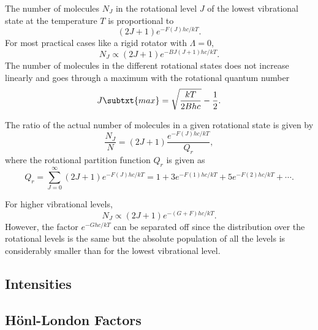 The number of molecules $N_{J}$ in the rotational level $J$ of the lowest vibrational state at the temperature $T$ is proportional to
\begin{equation*}
    (2J + 1)e^{-F(J)hc/kT}.
\end{equation*}
For most practical cases like a rigid rotator with $\Lambda = 0$,
\begin{equation*}
    N_{J} \propto (2J + 1)e^{-BJ(J + 1)hc/kT}.
\end{equation*}
The number of molecules in the different rotational states does not increase linearly and goes through a maximum with the rotational quantum number
\begin{equation*}
    J\subtxt{max} = \sqrt{\frac{kT}{2Bhc}} - \frac{1}{2}.
\end{equation*}

The ratio of the actual number of molecules in a given rotational state is given by
\begin{equation*}
    \frac{N_{J}}{N} = (2J + 1)\frac{e^{-F(J)hc/kT}}{Q_{r}},
\end{equation*}
where the rotational partition function $Q_{r}$ is given as
\begin{equation}
    Q_{r} = \sum_{J=0}^{\infty}(2J + 1)e^{-F(J)hc/kT} = 1 + 3e^{-F(1)hc/kT} + 5e^{-F(2)hc/kT} + \dotsb.
\end{equation}

For higher vibrational levels,
\begin{equation}
    N_{J} \propto (2J + 1)e^{-(G + F)hc/kT}.
\end{equation}
However, the factor $e^{-Ghc/kT}$ can be separated off since the distribution over the rotational levels is the same but the absolute population of all the levels is considerably smaller than for the lowest vibrational level.

\subsection{Intensities}

\subsection{H\"onl-London Factors}

